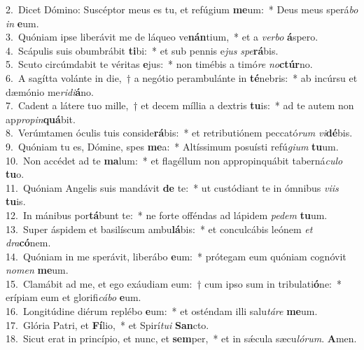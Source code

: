 {2.~}Dicet Dómino: Suscéptor meus es tu, et refúgium \textbf{me}um:~* Deus meus sperá\textit{bo} \textit{in} \textbf{e}um.\\
{3.~}Quóniam ipse liberávit me de láqueo ve\textbf{nán}tium,~* et a \textit{ver}\textit{bo} \textbf{á}spero.\\
{4.~}Scápulis suis obumbrábit \textbf{ti}bi:~* et sub pennis e\textit{jus} \textit{spe}\textbf{rá}bis.\\
{5.~}Scuto circúmdabit te véritas \textbf{e}jus:~* non timébis a timó\textit{re} \textit{no}\textbf{ctúr}no.\\
{6.~}A sagítta volánte in die,~† a negótio perambulánte in \textbf{té}nebris:~* ab incúrsu et dæmónio me\textit{ri}\textit{di}\textbf{á}no.\\
{7.~}Cadent a látere tuo mille,~† et decem míllia a dextris \textbf{tu}is:~* ad te autem non ap\textit{pro}\textit{pin}\textbf{quá}bit.\\
{8.~}Verúmtamen óculis tuis conside\textbf{rá}bis:~* et retributiónem peccató\textit{rum} \textit{vi}\textbf{dé}bis.\\
{9.~}Quóniam tu es, Dómine, spes \textbf{me}a:~* Altíssimum posuísti refú\textit{gi}\textit{um} \textbf{tu}um.\\
{10.~}Non accédet ad te \textbf{ma}lum:~* et flagéllum non appropinquábit taberná\textit{cu}\textit{lo} \textbf{tu}o.\\
{11.~}Quóniam Angelis suis mandávit \textbf{de} te:~* ut custódiant te in ómnibus \textit{vi}\textit{is} \textbf{tu}is.\\
{12.~}In mánibus por\textbf{tá}bunt te:~* ne forte offéndas ad lápidem \textit{pe}\textit{dem} \textbf{tu}um.\\
{13.~}Super áspidem et basilíscum ambu\textbf{lá}bis:~* et conculcábis leónem \textit{et} \textit{dra}\textbf{có}nem.\\
{14.~}Quóniam in me sperávit, liberábo \textbf{e}um:~* prótegam eum quóniam cognóvit \textit{no}\textit{men} \textbf{me}um.\\
{15.~}Clamábit ad me, et ego exáudiam eum:~† cum ipso sum in tribulati\textbf{ó}ne:~* erípiam eum et glorifi\textit{cá}\textit{bo} \textbf{e}um.\\
{16.~}Longitúdine diérum replébo \textbf{e}um:~* et osténdam illi salu\textit{tá}\textit{re} \textbf{me}um.\\
{17.~}Glória Patri, et \textbf{Fí}lio,~* et Spirí\textit{tu}\textit{i} \textbf{San}cto.\\
{18.~}Sicut erat in princípio, et nunc, et \textbf{sem}per,~* et in sǽcula sæcu\textit{ló}\textit{rum}. \textbf{A}men.\\
